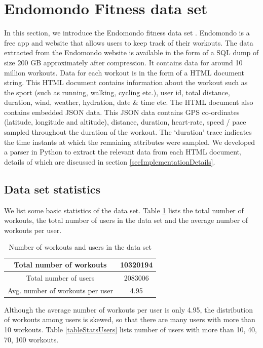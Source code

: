 \documentclass{acm_proc_article-sp}
\begin{document}
\section{Endomondo Fitness data set}
\label{secDataset}
In this section, we introduce the Endomondo fitness data set \cite{endomondo}. Endomondo \cite{endomondo} is a free app and website that allows users to keep track of their workouts. The data extracted from the Endomondo website \cite{endomondo} is available in the form of a SQL dump of size 200 GB approximately after compression. It contains data for around 10 million workouts. Data for each workout is in the form of a HTML document string. This HTML document contains information about the workout such as the sport (such as running, walking, cycling etc.), user id, total distance, duration, wind, weather, hydration, date \& time etc. The HTML document also contains embedded JSON data. This JSON data contains GPS co-ordinates (latitude, longitude and altitude), distance, duration, heart-rate, speed / pace sampled throughout the duration of the workout. The `duration' trace indicates the time instants at which the remaining attributes were sampled. We developed a parser in Python to extract the relevant data from each HTML document, details of which are discussed in section \ref{secImplementationDetails}.

\subsection{Data set statistics}

We list some basic statistics of the data set. Table \ref{tableStatsTotal} lists the total number of workouts, the total number of users in the data set and the average number of workouts per user.

\begin{table}[h]
\centering
\begin{tabular}{|c|c|} \hline
Total number of workouts & 10320194  \\ \hline
Total number of users  &  2083006 \\ \hline
Avg. number of workouts per user & 4.95 \\ \hline
\end{tabular}
\caption{Number of workouts and users in the data set}
\label{tableStatsTotal}
\end{table}

Although the average number of workouts per user is only 4.95, the distribution of workouts among users is skewed, so that there are many users with more than 10 workouts. Table \ref{tableStatsUsers} lists number of users with more than 10, 40, 70, 100 workouts.
\end{document}
